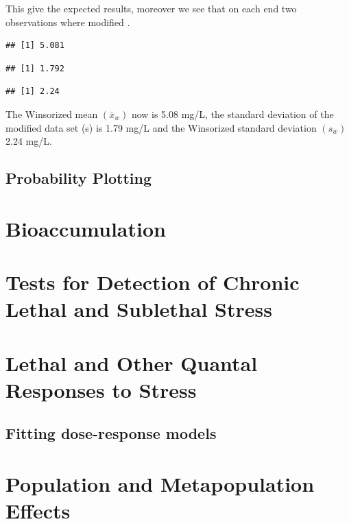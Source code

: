 \documentclass{tufte-book}
\begin{document}
This give the expected results, moreover we see that on each end two observations
where modified .

\begin{knitrout}
\color{fgcolor}\begin{kframe}
\begin{alltt}
\end{alltt}
\begin{verbatim}
## [1] 5.081
\end{verbatim}
\begin{alltt}
\end{alltt}
\begin{verbatim}
## [1] 1.792
\end{verbatim}
\begin{alltt}
\end{alltt}
\begin{verbatim}
## [1] 2.24
\end{verbatim}
\end{kframe}
\end{knitrout}





The Winsorized mean $(\bar{x}_w)$ now is 5.08 mg/L, the standard 
deviation of the modified data set (s) is 1.79 mg/L and the 
Winsorized standard deviation $(s_w)$ 2.24 mg/L.



\section{Probability Plotting}




\chapter{Bioaccumulation}



\chapter{Tests for Detection of Chronic Lethal and Sublethal Stress}



\chapter{Lethal and Other Quantal Responses to Stress}
\section{Fitting dose-response models}



\chapter{Population and Metapopulation Effects}
\end{document}
